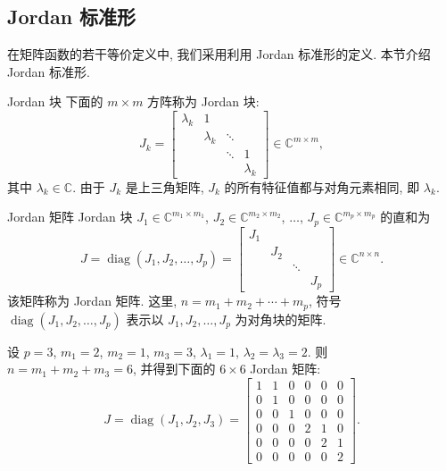 \subsection{{Jordan 标准形}}\label{sec:jordan-canonical-form}

{在矩阵函数的若干等价定义中, 我们采用利用 Jordan 标准形的定义. 本节介绍 Jordan 标准形.}

\begin{Definition}{{Jordan 块}}\label{def:jordan-block}
{下面的 $m\times m$ 方阵称为 Jordan 块:}
\[
J_k=\begin{bmatrix}\lambda_k&1&&\\&\lambda_k&\ddots&\\&&\ddots&1\\&&&\lambda_k\end{bmatrix}\in\mathbb{C}^{m\times m},
\]
{其中 $\lambda_k\in\mathbb{C}$. 由于 $J_k$ 是上三角矩阵, $J_k$ 的所有特征值都与对角元素相同, 即 $\lambda_k$.}
\end{Definition}

\begin{Definition}{{Jordan 矩阵}}\label{def:jordan-matrix}
{Jordan 块 $J_1\in\mathbb{C}^{m_1\times m_1}$, $J_2\in\mathbb{C}^{m_2\times m_2}$, $\ldots$, $J_p\in\mathbb{C}^{m_p\times m_p}$ 的直和为}
\begin{equation}\label{eq:jordan-block-diagonal}
J=\operatorname{diag}(J_1,J_2,\ldots,J_p)=\begin{bmatrix}J_1&&&\\&J_2&&\\&&\ddots&\\&&&J_p\end{bmatrix}\in\mathbb{C}^{n\times n}.
\end{equation}
{该矩阵称为 Jordan 矩阵. 这里, $n=m_1+m_2+\cdots+m_p$, 符号 $\operatorname{diag}(J_1,J_2,\ldots,J_p)$ 表示以 $J_1,J_2,\ldots,J_p$ 为对角块的矩阵.}
\end{Definition}

\begin{Example}\label{ex:jordan-block-diagonal-six}
{设 $p=3$, $m_1=2$, $m_2=1$, $m_3=3$, $\lambda_1=1$, $\lambda_2=\lambda_3=2$. 则 $n=m_1+m_2+m_3=6$, 并得到下面的 $6\times6$ Jordan 矩阵:}
\[
J=\operatorname{diag}(J_1,J_2,J_3)=\left[\begin{array}{cc|c|ccc}1&1&0&0&0&0\\0&1&0&0&0&0\\\hline0&0&1&0&0&0\\\hline0&0&0&2&1&0\\0&0&0&0&2&1\\0&0&0&0&0&2\end{array}\right].
\]
\end{Example}

